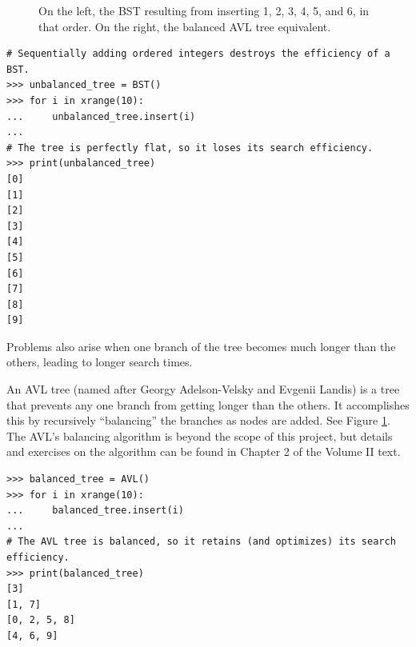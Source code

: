 \begin{figure}
\caption{On the left, the BST resulting from inserting 1, 2, 3, 4, 5, and 6, in that order. On the right, the balanced AVL tree equivalent.}
\label{fig:avl_balance}
\end{figure}

\begin{lstlisting}
# Sequentially adding ordered integers destroys the efficiency of a BST.
>>> unbalanced_tree = BST()
>>> for i in xrange(10):
...     unbalanced_tree.insert(i)
... 
# The tree is perfectly flat, so it loses its search efficiency.
>>> print(unbalanced_tree)
[0]
[1]
[2]
[3]
[4]
[5]
[6]
[7]
[8]
[9]
\end{lstlisting}

Problems also arise when one branch of the tree becomes much longer than the others, leading to longer search times.

An AVL tree (named after Georgy Adelson-Velsky and Evgenii Landis) is a tree that prevents any one branch from getting longer than the others.
It accomplishes this by recursively ``balancing'' the branches as nodes are added.
See Figure \ref{fig:avl_balance}.
The AVL's balancing algorithm is beyond the scope of this project, but details and exercises on the algorithm can be found in Chapter 2 of the Volume II text.

\begin{lstlisting}
>>> balanced_tree = AVL()
>>> for i in xrange(10):
...     balanced_tree.insert(i)
... 
# The AVL tree is balanced, so it retains (and optimizes) its search efficiency.
>>> print(balanced_tree)
[3]
[1, 7]
[0, 2, 5, 8]
[4, 6, 9]
\end{lstlisting}

